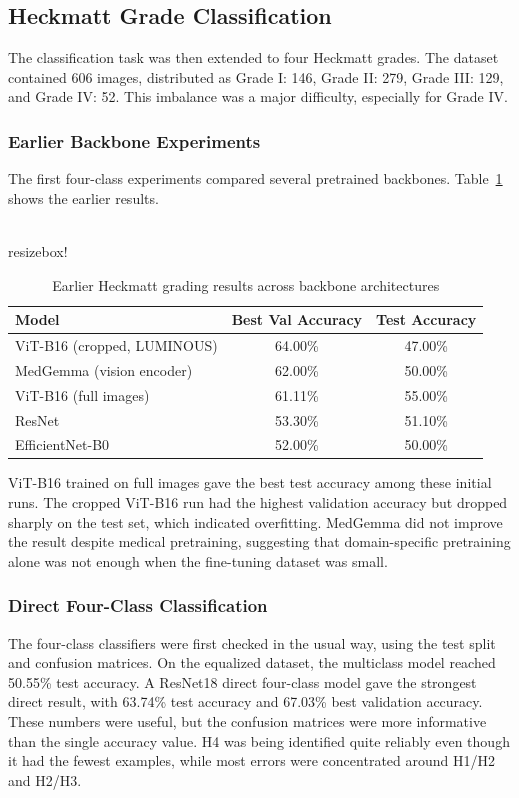 \subsection{Heckmatt Grade Classification}
The classification task was then extended to four Heckmatt grades. The dataset contained 606 images, distributed as Grade I: 146, Grade II: 279, Grade III: 129, and Grade IV: 52. This imbalance was a major difficulty, especially for Grade IV.

\subsubsection{Earlier Backbone Experiments}
The first four-class experiments compared several pretrained backbones. Table~\ref{tab:heckmatt_old_results} shows the earlier results.

\begin{table}[H]
\centering
\\resizebox{\textwidth}{!}{%
\begin{tabular}{lcc}
\toprule
\textbf{Model} & \textbf{Best Val Accuracy} & \textbf{Test Accuracy} \\
\midrule
ViT-B16 (cropped, LUMINOUS) & 64.00\% & 47.00\% \\
MedGemma (vision encoder) & 62.00\% & 50.00\% \\
ViT-B16 (full images) & 61.11\% & 55.00\% \\
ResNet & 53.30\% & 51.10\% \\
EfficientNet-B0 & 52.00\% & 50.00\% \\
\bottomrule
\end{tabular}}
\caption{Earlier Heckmatt grading results across backbone architectures}
\label{tab:heckmatt_old_results}
\end{table}

ViT-B16 trained on full images gave the best test accuracy among these initial runs. The cropped ViT-B16 run had the highest validation accuracy but dropped sharply on the test set, which indicated overfitting. MedGemma did not improve the result despite medical pretraining, suggesting that domain-specific pretraining alone was not enough when the fine-tuning dataset was small.

\subsubsection{Direct Four-Class Classification}
The four-class classifiers were first checked in the usual way, using the test split and confusion matrices. On the equalized dataset, the multiclass model reached 50.55\% test accuracy. A ResNet18 direct four-class model gave the strongest direct result, with 63.74\% test accuracy and 67.03\% best validation accuracy. These numbers were useful, but the confusion matrices were more informative than the single accuracy value. H4 was being identified quite reliably even though it had the fewest examples, while most errors were concentrated around H1/H2 and H2/H3.

